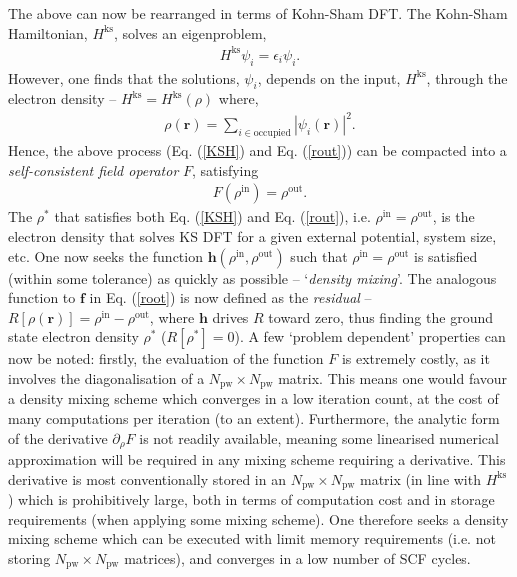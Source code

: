 The above can now be rearranged in terms of Kohn-Sham DFT. The Kohn-Sham Hamiltonian, $H^{\text{ks}}$, solves an eigenproblem,
\begin{align}
\label{KSH}
H^{\text{ks}} \psi_i = \epsilon_i \psi_i. 
\end{align} 
However, one finds that the solutions, $\psi_i$, depends on the input, $H^{\text{ks}}$, through the electron density -- $H^{\text{ks}} = H^{\text{ks}}(\rho)$ where,
\begin{align}
\label{rout}
\rho(\textbf{r}) = \sum_{i \in \text{occupied}} |\psi_i(\textbf{r})|^2.
\end{align} 
Hence, the above process (Eq$.$ (\ref{KSH}) and Eq$.$ (\ref{rout})) can be compacted into a \textit{self-consistent field operator} $F$, satisfying
\begin{align}
F(\rho^{\text{in}}) = \rho^{\text{out}}. 
\end{align} 
The $\rho^*$ that satisfies both Eq$.$ (\ref{KSH}) and Eq$.$ (\ref{rout}), i.e. $\rho^{\text{in}} = \rho^{\text{out}}$, is the electron density that solves KS DFT for a given external potential, system size, etc. One now seeks the function $\textbf{h}(\rho^{\text{in}}, \rho^{\text{out}})$ such that $\rho^{\text{in}} = \rho^{\text{out}}$ is satisfied (within some tolerance) as quickly as possible -- `\textit{density mixing}'.  The analogous function to $\textbf{f}$ in Eq$.$ (\ref{root}) is now defined as the \textit{residual} -- $R[\rho(\textbf{r})] =  \rho^{\text{in}} - \rho^{\text{out}}$, where $\textbf{h}$ drives $R$ toward zero, thus finding the ground state electron density $\rho^*$ ($R[\rho^*] = 0$). A few `problem dependent' properties can now be noted: firstly, the evaluation of the function $F$ is extremely costly, as it involves the diagonalisation of a $N_{\text{pw}} \times N_{\text{pw}}$ matrix. This means one would favour a density mixing scheme which converges in a low iteration count, at the cost of many computations per iteration (to an extent). Furthermore, the analytic form of the derivative $\partial_{\rho} F$ is not readily available, meaning some linearised numerical approximation will be required in any mixing scheme requiring a derivative. This derivative is most conventionally stored in an $N_{\text{pw}} \times N_{\text{pw}}$ matrix (in line with $H^{\text{ks}}$) which is prohibitively large, both in terms of computation cost and in storage requirements (when applying some mixing scheme). One therefore seeks a density mixing scheme which can be executed with limit memory requirements (i.e. not storing $N_{\text{pw}} \times N_{\text{pw}}$ matrices), and converges in a low number of SCF cycles.

